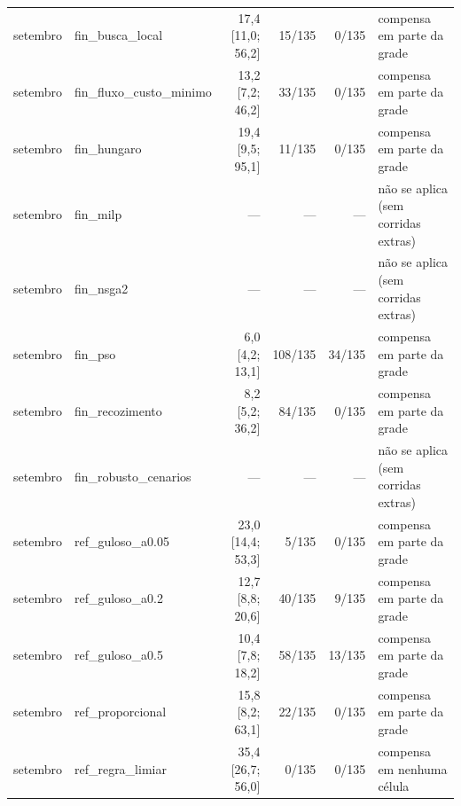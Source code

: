 \begin{tabular}{llrrrl}
setembro & fin\_busca\_local & 17{,}4 [11{,}0; 56{,}2] & 15/135 & 0/135 & compensa em parte da grade \\
setembro & fin\_fluxo\_custo\_minimo & 13{,}2 [7{,}2; 46{,}2] & 33/135 & 0/135 & compensa em parte da grade \\
setembro & fin\_hungaro & 19{,}4 [9{,}5; 95{,}1] & 11/135 & 0/135 & compensa em parte da grade \\
setembro & fin\_milp & --- & --- & --- & não se aplica (sem corridas extras) \\
setembro & fin\_nsga2 & --- & --- & --- & não se aplica (sem corridas extras) \\
setembro & fin\_pso & 6{,}0 [4{,}2; 13{,}1] & 108/135 & 34/135 & compensa em parte da grade \\
setembro & fin\_recozimento & 8{,}2 [5{,}2; 36{,}2] & 84/135 & 0/135 & compensa em parte da grade \\
setembro & fin\_robusto\_cenarios & --- & --- & --- & não se aplica (sem corridas extras) \\
setembro & ref\_guloso\_a0.05 & 23{,}0 [14{,}4; 53{,}3] & 5/135 & 0/135 & compensa em parte da grade \\
setembro & ref\_guloso\_a0.2 & 12{,}7 [8{,}8; 20{,}6] & 40/135 & 9/135 & compensa em parte da grade \\
setembro & ref\_guloso\_a0.5 & 10{,}4 [7{,}8; 18{,}2] & 58/135 & 13/135 & compensa em parte da grade \\
setembro & ref\_proporcional & 15{,}8 [8{,}2; 63{,}1] & 22/135 & 0/135 & compensa em parte da grade \\
setembro & ref\_regra\_limiar & 35{,}4 [26{,}7; 56{,}0] & 0/135 & 0/135 & compensa em nenhuma célula \\
\hline
\end{tabular}

